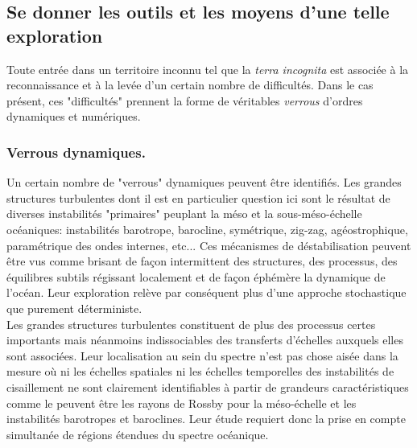 \subsection{Se donner les outils et les moyens d'une telle exploration}
\color{blue}
Toute entrée dans un territoire inconnu tel que la \textit{terra incognita} est associée à la reconnaissance et à la levée d'un certain nombre de difficultés. Dans le cas présent, ces "difficultés" prennent la forme de véritables \textit{verrous} d'ordres dynamiques et numériques.
\subsubsection{Verrous dynamiques.}
Un certain nombre de "verrous" dynamiques peuvent être identifiés. Les grandes structures turbulentes dont il est en particulier question ici sont le résultat de diverses instabilités "primaires" peuplant la méso et la sous-méso-échelle océaniques: instabilités barotrope, barocline, symétrique, zig-zag, agéostrophique, paramétrique des ondes internes, etc... Ces mécanismes de déstabilisation peuvent être vus comme brisant de façon intermittent des structures, des processus, des équilibres subtils régissant localement et de façon éphémère la dynamique de l'océan. Leur exploration relève par conséquent plus d'une approche stochastique que purement déterministe.\\
Les grandes structures turbulentes constituent de plus des processus certes importants mais néanmoins indissociables des transferts d'échelles auxquels elles sont associées. Leur localisation au sein du spectre n'est pas chose aisée dans la mesure où ni les échelles spatiales ni les échelles temporelles des instabilités de cisaillement ne sont clairement identifiables à partir de grandeurs caractéristiques comme le peuvent être les rayons de Rossby pour la méso-échelle et les instabilités barotropes et baroclines. Leur étude requiert donc la prise en compte simultanée de régions étendues du spectre océanique.\\

